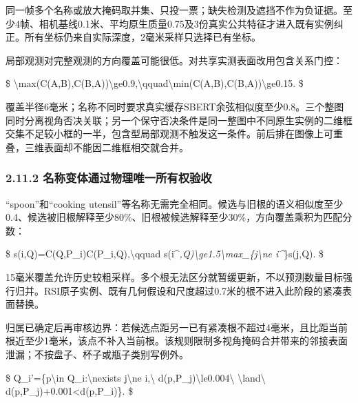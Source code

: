 \documentclass[UTF8,fontset=fandol]{ctexart}
\begin{document}
同一帧多个名称或放大掩码取并集、只投一票；缺失检测及遮挡不作为负证据。至少4帧、相机基线0.1米、平均原生质量0.75及3份真实公共特征才进入既有实例纠正。所有坐标仍来自实际深度，2毫米采样只选择已有坐标。



局部观测对完整观测的方向覆盖可能很低。对共享实测表面改用包含关系门控：



\$
\textbackslash{}max(C(A,B),C(B,A))\textbackslash{}ge0.9,\textbackslash{}qquad\textbackslash{}min(C(A,B),C(B,A))\textbackslash{}ge0.15.
\$



覆盖半径6毫米；名称不同时要求真实缓存SBERT余弦相似度至少0.8。三个整图同时分离视角否决关联；另一个保守否决条件是同一整图中不同原生实例的二维框交集不足较小框的一半，包含型局部观测不触发这一条件。前后排在图像上可重叠，三维表面却不能因二维框相交就合并。



\subsubsection*{2.11.2 名称变体通过物理唯一所有权验收}

“spoon”和“cooking utensil”等名称无需完全相同。候选与旧根的语义相似度至少0.4、候选被旧根解释至少80\%、旧根被候选解释至少30\%，方向覆盖乘积为匹配分数：



\$
s(i,Q)=C(Q,P\_i)C(P\_i,Q),\textbackslash{}qquad s(i\textasciicircum{}\emph{,Q)\textbackslash{}ge1.5\textbackslash{}max\_\{j\textbackslash{}ne i\textasciicircum{}}\}s(j,Q).
\$



15毫米覆盖允许历史较粗采样。多个根无法区分就暂缓更新，不以预测数量目标强行归并。RSI原子实例、既有几何假设和尺度超过0.7米的根不进入此阶段的紧凑表面替换。



归属已确定后再审核边界：若候选点距另一已有紧凑根不超过4毫米，且比距当前根近至少1毫米，该点不补入当前根。该规则限制多视角掩码合并带来的邻接表面泄漏；不按盘子、杯子或瓶子类别写例外。



\$
Q\_i'=\{p\textbackslash{}in Q\_i:\textbackslash{}nexists j\textbackslash{}ne i,\textbackslash{} d(p,P\_j)\textbackslash{}le0.004\textbackslash{} \textbackslash{}land\textbackslash{} d(p,P\_j)+0.001<d(p,P\_i)\}.
\$
\end{document}

